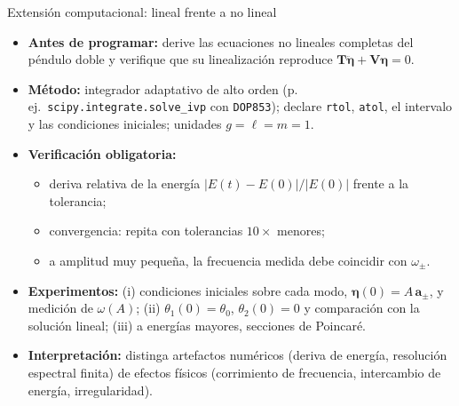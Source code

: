 \documentclass[spanish]{beamer}
\newcommand{\Tm}{\mathbf{T}}              %
\newcommand{\Vm}{\mathbf{V}}              %
\newcommand{\bfeta}{\boldsymbol{\eta}}    %
\newcommand{\ba}{\boldsymbol{a}}          %
\begin{document}
\begin{frame}{Extensión computacional: lineal frente a no lineal}
\begin{itemize}
\item<1-> \textbf{Antes de programar:} derive las ecuaciones no lineales completas del péndulo doble y verifique que su linealización reproduce $\Tm\ddot{\bfeta}+\Vm\bfeta=0$.
\item<2-> \textbf{Método:} integrador adaptativo de alto orden (p.\,ej.\ \texttt{scipy.integrate.solve\_ivp} con \texttt{DOP853}); declare \texttt{rtol}, \texttt{atol}, el intervalo y las condiciones iniciales; unidades $g=\ell=m=1$.
\item<3-> \textbf{Verificación obligatoria:}
\begin{itemize}
\item deriva relativa de la energía $|E(t)-E(0)|/|E(0)|$ frente a la tolerancia;
\item convergencia: repita con tolerancias $10\times$ menores;
\item a amplitud muy pequeña, la frecuencia medida debe coincidir con $\omega_\pm$.
\end{itemize}
\item<4-> \textbf{Experimentos:} (i) condiciones iniciales sobre cada modo, $\bfeta(0)=A\,\ba_\pm$, y medición de $\omega(A)$; (ii) $\theta_1(0)=\theta_0$, $\theta_2(0)=0$ y comparación con la solución lineal; (iii) a energías mayores, secciones de Poincaré.
\item<5-> \textbf{Interpretación:} distinga artefactos numéricos (deriva de energía, resolución espectral finita) de efectos físicos (corrimiento de frecuencia, intercambio de energía, irregularidad).
\end{itemize}
\end{frame}

\end{document}
